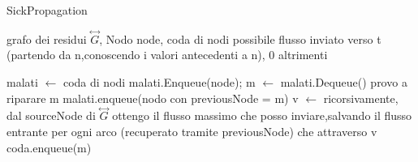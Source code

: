 \documentclass{article}
\begin{document}
\begin{algorithm}
\caption{SickPropagation}
\begin{algorithmic}
\REQUIRE grafo dei residui $\overset{\leftrightarrow}{G}$, Nodo node, coda di nodi
\ENSURE possibile flusso inviato verso t (partendo da n,conoscendo i valori antecedenti a n), 0 altrimenti

\STATE malati $\leftarrow$ coda di nodi
\STATE malati.Enqueue(node);
\STATE m $\leftarrow$ malati.Dequeue()
\STATE provo a riparare m
\STATE malati.enqueue(nodo con previousNode = m)
\STATE v $\leftarrow$ ricorsivamente, dal sourceNode di $\overset{\leftrightarrow}{G}$ ottengo il flusso massimo che posso inviare,salvando il flusso entrante per ogni arco (recuperato tramite previousNode) che attraverso
\RETURN v
\ELSE
\STATE coda.enqueue(m)
\ENDIF
\ENDWHILE
{}
\end{algorithmic}
\end{algorithm}
\end{document}
